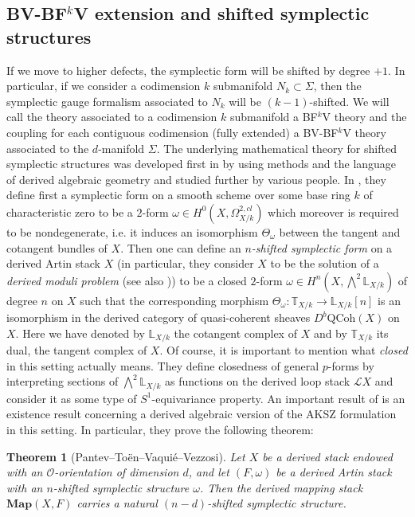 \documentclass[11pt,colorinlistoftodos]{amsart}
\numberwithin{equation}{subsection}
\theoremstyle{plain}
\newtheorem{thm}{Theorem}[subsection]
\theoremstyle{definition}
\theoremstyle{remark}
\newcommand{\calO}{\mathcal{O}}
\newcommand{\calL}{\mathcal{L}}
\begin{document}
\subsection{BV-BF$^k$V extension and shifted symplectic structures}
\label{subsec:shifted_symplectic_structures}
If we move to higher defects, the symplectic form will be shifted by degree $+1$. In particular, if we consider a codimension $k$ submanifold $N_k\subset\Sigma$, then the symplectic gauge formalism associated to $N_k$ will be $(k-1)$-shifted. We will call the theory associated to a codimension $k$ submanifold a BF$^k$V theory and the coupling for each contiguous codimension (fully extended) a BV-BF$^k$V theory associated to the $d$-manifold $\Sigma$. The underlying mathematical theory for shifted symplectic structures was developed first in \cite{PantevToenVaquieVezzosi2013} by using methods and the language of derived algebraic geometry and studied further by various people. In \cite{PantevToenVaquieVezzosi2013}, they define first a symplectic form on a smooth scheme over some base ring $k$ of characteristic zero to be a $2$-form $\omega\in H^0(X,\Omega^{2,cl}_{X/k})$ which moreover is required to be nondegenerate, i.e. it induces an isomorphism $\Theta_\omega$ between the tangent and cotangent bundles of $X$. 
Then one can define an \emph{$n$-shifted symplectic form} on a derived Artin stack $X$ (in particular, they consider $X$ to be the solution of a \emph{derived moduli problem} (see also \cite{Toen2014})) to be a closed $2$-form $\omega\in H^n(X,\bigwedge^2\mathbb{L}_{X/k})$ of degree $n$ on $X$ such that the corresponding morphism $\Theta_\omega\colon \mathbb{T}_{X/k}\to \mathbb{L}_{X/k}[n]$ is an isomorphism in the derived category of quasi-coherent sheaves $D^b\mathrm{QCoh}(X)$ on $X$. Here we have denoted by $\mathbb{L}_{X/k}$ the cotangent complex of $X$ and by $\mathbb{T}_{X/k}$ its dual, the tangent complex of $X$. Of course, it is important to mention what \emph{closed} in this setting actually means. They define closedness of general $p$-forms by interpreting sections of $\bigwedge^2\mathbb{L}_{X/k}$ as functions on the derived loop stack $\calL X$ and consider it as some type of $S^1$-equivariance property. An important result of \cite{PantevToenVaquieVezzosi2013} is an existence result concerning a derived algebraic version of the AKSZ formulation in this setting. In particular, they prove the following theorem:
\begin{thm}[Pantev--To\"en--Vaqui\'e--Vezzosi\cite{PantevToenVaquieVezzosi2013}]
Let $X$ be a derived stack endowed with an $\calO$-orientation of dimension $d$, and let $(F,\omega)$ be a derived Artin stack with an $n$-shifted symplectic structure $\omega$. Then the derived mapping stack $\mathbf{Map}(X,F)$ carries a natural $(n-d)$-shifted symplectic structure.
\end{thm}
\end{document}
